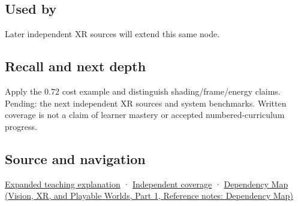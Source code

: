 \subsection{Used by}\label{appendix-5878b813b732-used-by}

\hypertarget{appendix-5878b813b732-used-by}{}

Later independent XR sources will extend this same node.

\subsection{Recall and next depth}\label{appendix-5878b813b732-recall-and-next-depth}

\hypertarget{appendix-5878b813b732-recall-and-next-depth}{}

Apply the 0.72 cost example and distinguish shading/frame/energy claims. Pending: the next independent XR sources and system benchmarks. Written coverage is not a claim of learner mastery or accepted numbered-curriculum progress.

\subsection{Source and navigation}\label{appendix-5878b813b732-source-and-navigation}

\hypertarget{appendix-5878b813b732-source-and-navigation}{}

\hyperref[04-visual-computing-ii-ch042-foveation-is-allocation-under-uncertain-perception-and-timing]{Expanded teaching explanation} · \hyperref[appendix-fd090d982a15-xr01---independent-seeing-and-representation-source]{Independent coverage} · \href{../07-Vision-XR-and-Playable-Worlds-P01/main.pdf\#nameddest=appendix-4ad47bdd269a}{Dependency Map (Vision, XR, and Playable Worlds, Part 1, Reference notes: Dependency Map)}
